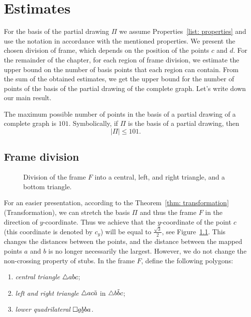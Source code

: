 \chapter{Estimates}
For the basis of the partial drawing $\Pi$ we assume Properties~\ref{list: properties} and use the notation in accordance with the mentioned properties. We present the chosen division of frame, which depends on the position of the points $c$ and $d$. For the remainder of the chapter, for each region of frame division, we estimate the upper bound on the number of basis points that each region can contain. From the sum of the obtained estimates, we get the upper bound for the number of points of the basis of the partial drawing of the complete graph. Let’s write down our main result.

\begin{theorem}
The maximum possible number of points in the basis of a partial drawing of a complete graph is $101$. Symbolically, if $\Pi$ is the basis of a partial drawing, then
\begin{equation}
  |\Pi| \leq 101.
\end{equation}
\label{thm: main}
\end{theorem}


\section{Frame division}
\begin{figure}
\centering

\caption{Division of the frame $F$ into a central, left, and right triangle, and a bottom triangle.}
\label{fig: frame-subsets}
\end{figure}

For an easier presentation, according to the Theorem~\ref{thm: transformation}(Transformation), we can stretch the basis $\Pi$ and thus the frame $F$ in the direction of $y$-coordinate. Thus we achieve that the $y$-coordinate of the point $c$ (this coordinate is denoted by $c_{y}$) will be equal to $\frac{\sqrt{3}}{2}$, see Figure~\ref{fig: frame-subsets}. This changes the distances between the points, and the distance between the mapped points $a$ and $b$ is no longer necessarily the largest. However, we do not change the non-crossing property of stubs. In the frame $F$, define the following polygons:

\begin{enumerate}
  \item[{1)}] \textit{central triangle} $\triangle{abc}$;
  \item[{3)}] \textit{left and right triangle} $\triangle{ac\tilde{a}}$ in $\triangle{b\tilde{b}c}$;
  \item[{3)}] \textit{lower quadrilateral} $\rectansym{\undersym{a}\undersym{b}ba}$.
\end{enumerate}

